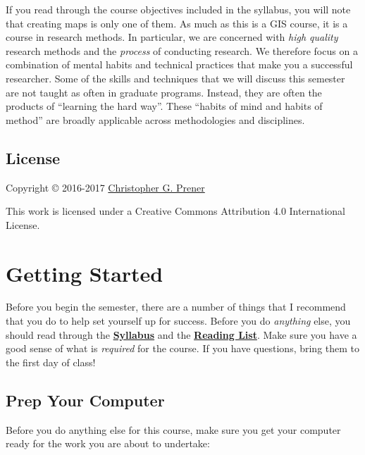 \documentclass[]{book}
\begin{document}
If you read through the course objectives included in the syllabus, you
will note that creating maps is only one of them. As much as this is a
GIS course, it is a course in research methods. In particular, we are
concerned with \emph{high quality} research methods and the
\emph{process} of conducting research. We therefore focus on a
combination of mental habits and technical practices that make you a
successful researcher. Some of the skills and techniques that we will
discuss this semester are not taught as often in graduate programs.
Instead, they are often the products of ``learning the hard way''. These
``habits of mind and habits of method'' are broadly applicable across
methodologies and disciplines.

\section*{License}\label{license}

Copyright © 2016-2017 \href{http://chrisprener.net}{Christopher G.
Prener}

This work is licensed under a Creative Commons Attribution 4.0
International License.

\chapter{Getting Started}\label{gettingStarted}

Before you begin the semester, there are a number of things that I
recommend that you do to help set yourself up for success. Before you do
\emph{anything} else, you should read through the
\href{}{\textbf{Syllabus}} and the \href{}{\textbf{Reading List}}. Make
sure you have a good sense of what is \emph{required} for the course. If
you have questions, bring them to the first day of class!

\section{Prep Your Computer}\label{prep-your-computer}

Before you do anything else for this course, make sure you get your
computer ready for the work you are about to undertake:
\end{document}
